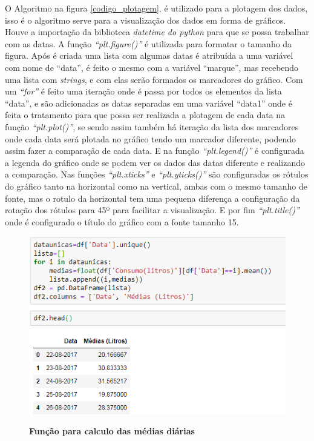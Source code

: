 \par O Algoritmo na figura \ref{codigo_plotagem}, é utilizado para a plotagem dos dados, isso é o algoritmo serve para a visualização dos dados em forma de gráficos. Houve a importação da biblioteca \emph{datetime do python} para que se possa trabalhar com as datas. A função \emph{“plt.figure()”} é utilizada para formatar o tamanho da figura. Após é criada uma lista com algumas datas é atribuída a uma variável com nome de “data”, é feito o mesmo com a variável “marque”, mas recebendo uma lista com \emph{strings}, e com elas serão formados os marcadores do gráfico. Com um \emph{“for”} é feito uma iteração onde é passa por todos os elementos da lista “data”, e são adicionadas as datas separadas em uma variável “data1” onde é feita o tratamento para que possa ser realizada a plotagem de cada data na função \emph{“plt.plot()”}, se sendo assim também há iteração da lista dos marcadores onde cada data será plotada no gráfico tendo um marcador diferente, podendo assim fazer a comparação de cada data. E na função \emph{“plt.legend()”} é configurada a legenda do gráfico onde se podem ver os dados das datas diferente e realizando a comparação. Nas funções \emph{“plt.xticks”} e \emph{“plt.yticks()”} são configuradas os rótulos do gráfico tanto na horizontal como na vertical, ambas com o mesmo tamanho de fonte, mas o rotulo da horizontal tem uma pequena diferença a configuração da rotação dos rótulos para 45º para facilitar a visualização. E por fim \emph{“plt.title()”} onde é configurado o título do gráfico com a fonte tamanho 15. 

\begin{figure}[ht]
	\caption{\textbf{Função para calculo das médias diárias}}
	\centering
		\includegraphics[scale=1, keepaspectratio]{figuras/codigoparacalculodemediasdiarias}
		\label{codigo_medias_diarias}
\end{figure}

